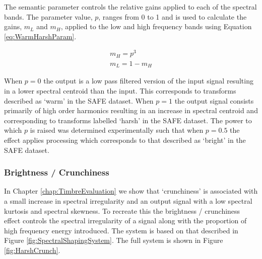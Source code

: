 			The semantic parameter controls the relative gains applied to each of the spectral bands. The
			parameter value, $p$, ranges from 0 to 1 and is used to calculate the gains, $m_{L}$ and $m_{H}$,
			applied to the low and high frequency bands using Equation \ref{eq:WarmHarshParam}.

			\begin{gather}
				m_{H} = p^{3} \nonumber \\
				m_{L} = 1 - m_{H}
				\label{eq:WarmHarshParam}
			\end{gather}

			When $p = 0$  the output is a low pass filtered version of the input signal resulting in a lower
			spectral centroid than the input. This corresponds to transforms  described as `warm' in the SAFE
			dataset. When $p = 1$ the output signal consists primarily of high order harmonics resulting in an
			increase in spectral centroid and corresponding to transforms labelled `harsh' in the SAFE dataset.
			The power to which $p$ is raised was determined experimentally such that when $p = 0.5$ the effect
			applies processing which corresponds to that described as `bright' in the SAFE dataset. 

		\subsubsection*{Brightness / Crunchiness}
			In Chapter \ref{chap:TimbreEvaluation} we show that `crunchiness' is associated with a small
			increase in spectral irregularity and an output signal with a low spectral kurtosis and spectral
			skewness. To recreate this the brightness / crunchiness effect controls the spectral irregularity
			of a signal along with the proportion of high frequency energy introduced.  The system is based on
			that described in Figure \ref{fig:SpectralShapingSystem}. The full system is shown in Figure
			\ref{fig:HarshCrunch}.

